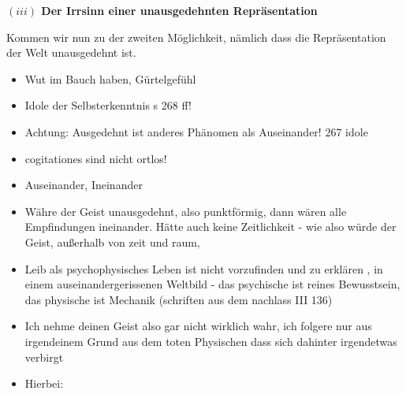 \documentclass[a4paper, 12pt]{article}
\begin{document}
\begin{onehalfspace}



\vspace{5mm}
\noindent\textbf{$(iii)$ Der Irrsinn einer unausgedehnten Repräsentation}


Kommen wir nun zu der zweiten Möglichkeit, nämlich dass die Repräsentation der Welt unausgedehnt ist. 


\begin{itemize}
  \item Wut im Bauch haben, Gürtelgefühl
  \item Idole der Selbsterkenntnis s 268 ff!
  \item Achtung: Ausgedehnt ist anderes Phänomen als Auseinander! 267 idole
  \item cogitationes sind nicht ortlos!
  \item Auseinander, Ineinander
  \item Währe der Geist unausgedehnt, also punktförmig, dann wären alle Empfindungen ineinander. Hätte auch keine Zeitlichkeit - wie also würde der Geist, außerhalb von zeit und raum, 
  \item Leib als psychophysisches Leben ist nicht vorzufinden und zu erklären , in einem auseinandergerissenen Weltbild - das psychische ist reines Bewusstsein, das physische ist Mechanik (schriften aus dem nachlass III 136)
  \item Ich nehme deinen Geist also gar nicht wirklich wahr, ich folgere nur aus irgendeinem Grund aus dem toten Physischen dass sich dahinter irgendetwas verbirgt
  \item Hierbei: 
\end{itemize}





\end{onehalfspace}
\end{document}
